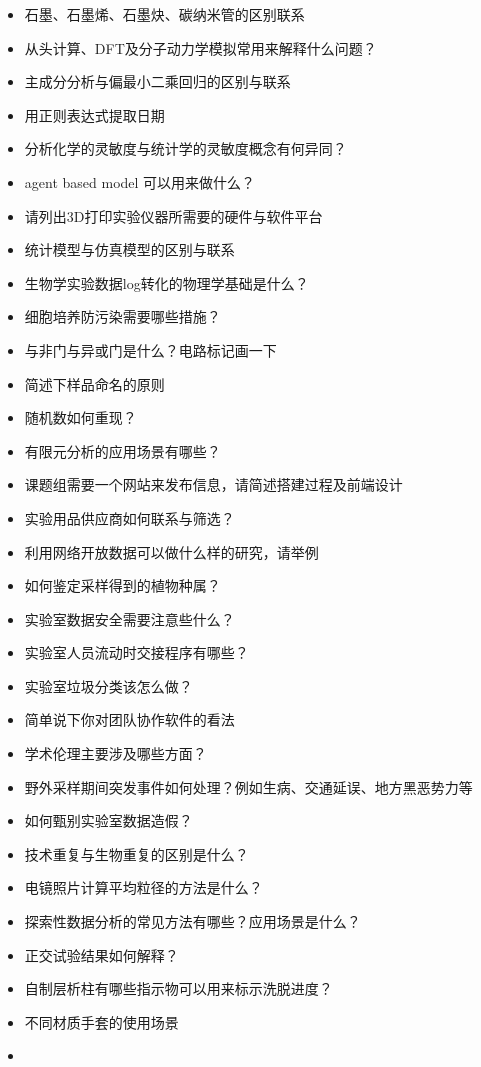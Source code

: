 \documentclass[]{tufte-book}
\begin{document}
\begin{itemize}
\item
  石墨、石墨烯、石墨炔、碳纳米管的区别联系
\item
  从头计算、DFT及分子动力学模拟常用来解释什么问题？
\item
  主成分分析与偏最小二乘回归的区别与联系
\item
  用正则表达式提取日期
\item
  分析化学的灵敏度与统计学的灵敏度概念有何异同？
\item
  agent based model 可以用来做什么？
\item
  请列出3D打印实验仪器所需要的硬件与软件平台
\item
  统计模型与仿真模型的区别与联系
\item
  生物学实验数据log转化的物理学基础是什么？
\item
  细胞培养防污染需要哪些措施？
\item
  与非门与异或门是什么？电路标记画一下
\item
  简述下样品命名的原则
\item
  随机数如何重现？
\item
  有限元分析的应用场景有哪些？
\item
  课题组需要一个网站来发布信息，请简述搭建过程及前端设计
\item
  实验用品供应商如何联系与筛选？
\item
  利用网络开放数据可以做什么样的研究，请举例
\item
  如何鉴定采样得到的植物种属？
\item
  实验室数据安全需要注意些什么？
\item
  实验室人员流动时交接程序有哪些？
\item
  实验室垃圾分类该怎么做？
\item
  简单说下你对团队协作软件的看法
\item
  学术伦理主要涉及哪些方面？
\item
  野外采样期间突发事件如何处理？例如生病、交通延误、地方黑恶势力等
\item
  如何甄别实验室数据造假？
\item
  技术重复与生物重复的区别是什么？
\item
  电镜照片计算平均粒径的方法是什么？
\item
  探索性数据分析的常见方法有哪些？应用场景是什么？
\item
  正交试验结果如何解释？
\item
  自制层析柱有哪些指示物可以用来标示洗脱进度？
\item
  不同材质手套的使用场景
\item

\end{itemize}
\end{document}
